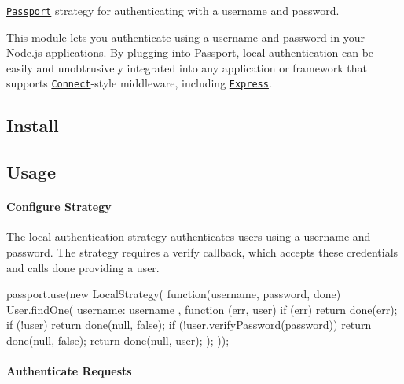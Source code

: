 \href{https://travis-ci.org/jaredhanson/passport-local}{\tt } \href{https://coveralls.io/r/jaredhanson/passport-local}{\tt } \href{https://codeclimate.com/github/jaredhanson/passport-local}{\tt } \href{https://david-dm.org/jaredhanson/passport-local}{\tt } \href{https://www.gittip.com/jaredhanson/}{\tt }

\href{http://passportjs.org/}{\tt Passport} strategy for authenticating with a username and password.

This module lets you authenticate using a username and password in your Node.\+js applications. By plugging into Passport, local authentication can be easily and unobtrusively integrated into any application or framework that supports \href{http://www.senchalabs.org/connect/}{\tt Connect}-\/style middleware, including \href{http://expressjs.com/}{\tt Express}.

\subsection*{Install}



\subsection*{Usage}

\paragraph*{Configure Strategy}

The local authentication strategy authenticates users using a username and password. The strategy requires a {\ttfamily verify} callback, which accepts these credentials and calls {\ttfamily done} providing a user. \begin{DoxyVerb}passport.use(new LocalStrategy(
  function(username, password, done) {
    User.findOne({ username: username }, function (err, user) {
      if (err) { return done(err); }
      if (!user) { return done(null, false); }
      if (!user.verifyPassword(password)) { return done(null, false); }
      return done(null, user);
    });
  }
));
\end{DoxyVerb}


\paragraph*{Authenticate Requests}

